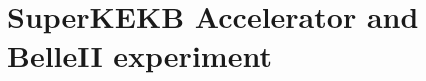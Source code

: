 \chapter{SuperKEKB Accelerator and BelleII experiment}\label{sec:SuperKEKB Accelerator and BelleII experiment}